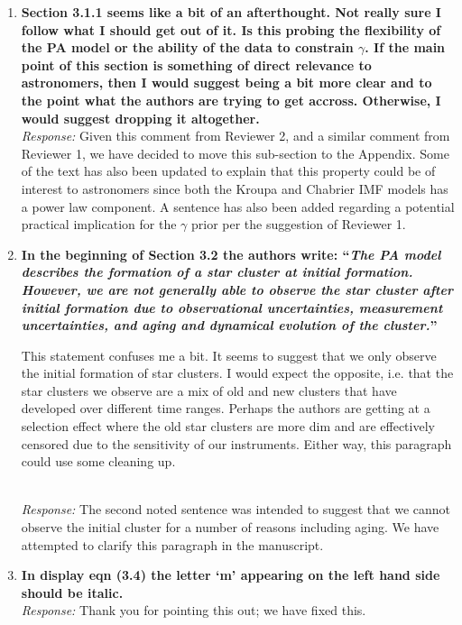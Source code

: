 \documentclass[11pt, oneside]{article}   	%
\begin{document}
\begin{enumerate}
\item {\bf Section 3.1.1 seems like a bit of an afterthought. Not really sure I follow what I should get out of it. Is this probing the flexibility of the PA model or the ability of the data to constrain $\gamma$. If the main point of this section is something of direct relevance to astronomers, then I would suggest being a bit more clear and to the point what the authors are trying to get accross. Otherwise, I would suggest dropping it altogether.
}\\
\noindent \emph{Response:} Given this comment from Reviewer 2, and a similar comment from Reviewer 1, we have decided to move this sub-section to the Appendix.  Some of the text has also been updated to explain that this property could be of interest to astronomers since both the Kroupa and Chabrier IMF models has a power law component.  A sentence has also been added regarding a potential practical implication for the $\gamma$ prior per the suggestion of Reviewer 1.
\bigskip

\item {\bf In the beginning of Section 3.2 the authors write: ``\emph{The PA model describes the formation of a star cluster at initial formation. However, we are not generally able to observe the star cluster after initial formation due to observational uncertainties, measurement uncertainties, and aging and dynamical evolution of the cluster.}''

This statement confuses me a bit. It seems to suggest that we only observe the initial formation of star clusters. I would expect the opposite, i.e. that the star clusters we observe are a mix of old and new clusters that have developed over different time ranges. Perhaps the authors are getting at a selection effect where the old star clusters are more dim and are effectively censored due to the sensitivity of our instruments. Either way, this paragraph could use some cleaning up.} \\
\noindent \emph{Response:} The second noted sentence was intended to suggest that we cannot observe the initial cluster for a number of reasons including aging.  We have attempted to clarify this paragraph in the manuscript.
\bigskip

\item {\bf In display eqn (3.4) the letter `m' appearing on the left hand side should be italic.} \\
\noindent \emph{Response:} Thank you for pointing this out; we have fixed this.
\bigskip


\end{enumerate}
\end{document}
